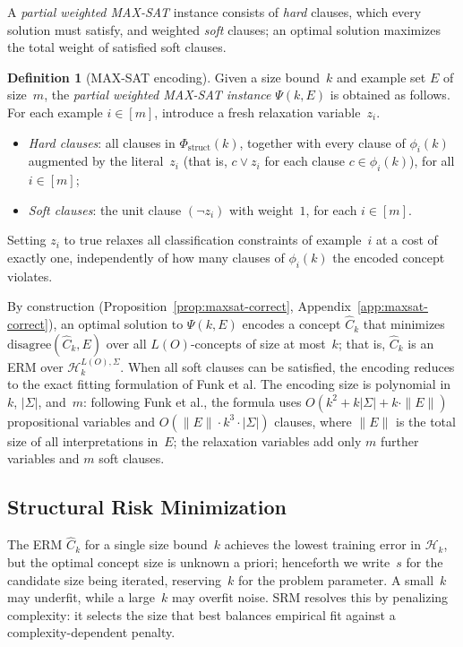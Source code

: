 \documentclass[accepted]{uai2026} %
\theoremstyle{definition}
\newtheorem{definition}[theorem]{Definition}
\theoremstyle{remark}
\newcommand{\disagree}{\mathrm{disagree}}
\begin{document}
A \emph{partial weighted MAX-SAT} instance
consists of \emph{hard} clauses, which every solution must
satisfy, and weighted \emph{soft} clauses; an optimal solution
maximizes the total weight of satisfied soft clauses.

\begin{definition}[MAX-SAT encoding]\label{def:maxsat}
  Given a size bound~$k$ and example set $E$ of
  size~$m$, the \emph{partial weighted MAX-SAT instance}
  $\Psi(k, E)$ is obtained as follows. For
  each example $i \in [m]$, introduce a fresh relaxation
  variable~$z_i$.
  \begin{itemize}[leftmargin=*,itemsep=1pt,topsep=2pt]
    \item \emph{Hard clauses}: all clauses in
      $\Phi_{\mathrm{struct}}(k)$,
      together with every clause of
      $\phi_i(k)$ augmented by the literal~$z_i$ (that is,
      $c \vee z_i$ for each clause $c \in \phi_i(k)$), for all
      $i \in [m]$;
    \item \emph{Soft clauses}: the unit
      clause $(\neg z_i)$ with weight~$1$, for each $i \in [m]$.
  \end{itemize}
  Setting $z_i$ to true relaxes all
  classification constraints of example~$i$ at a cost of exactly
  one, independently of how many clauses of $\phi_i(k)$ the
  encoded concept violates.
\end{definition}

By construction (Proposition~\ref{prop:maxsat-correct},
Appendix~\ref{app:maxsat-correct}), an optimal solution to
$\Psi(k, E)$ encodes a concept $\hat{C}_k$ that minimizes
$\disagree(\hat{C}_k, E)$ over all $L(O)$-concepts of size at
most~$k$; that is, $\hat{C}_k$ is an ERM over $\mathcal{H}_{k}^{L(O),\Sigma}$. When all soft
clauses can be satisfied, the encoding reduces to the
exact fitting formulation of Funk et al.
The encoding size is polynomial in~$k$, $|\Sigma|$, and~$m$:
following Funk et al., 
the formula uses $O(k^2 + k|\Sigma| + k \cdot \|E\|)$ propositional
variables and $O(\|E\| \cdot k^3 \cdot |\Sigma|)$ clauses, where $\|E\|$
is the total size of all interpretations in~$E$; the relaxation
variables add only $m$ further variables and $m$ soft clauses.

\subsection{Structural Risk Minimization}\label{sec:algorithm:srm}

The ERM $\hat{C}_k$ for a single size bound~$k$
achieves the lowest training error in $\mathcal{H}_k$, but the
optimal concept size is unknown a priori;
henceforth we write~$s$ for the candidate size being iterated,
reserving~$k$ for the problem parameter. A small~$k$ may underfit,
while a large~$k$ may overfit noise. SRM resolves this by penalizing
complexity: it selects the size that best balances empirical fit
against a complexity-dependent penalty.
\end{document}

